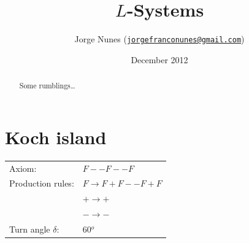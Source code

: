 \documentclass[11pt]{article}
\title{$L$-Systems}
\author{Jorge Nunes ({\tt\href{mailto:jorgefranconunes@gmail.com}{jorgefranconunes@gmail.com}})}
\date{December 2012}
\begin{document}
\maketitle

\begin{abstract}
\noindent Some rumblings\ldots
\end{abstract}





\section{Koch island}

\begin{tabular}{ll}
Axiom: & $F - - F - - F$ \\
Production rules: & $F \to F + F - - F + F$ \\
& $+ \to +$ \\
& $- \to -$ \\
Turn angle $\delta$: & 60$^o$ \\
\end{tabular}
\end{document}
